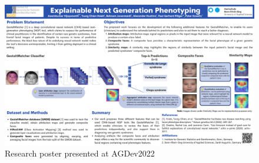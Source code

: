 \documentclass[../report.tex]{subfiles}
\begin{document}
\begin{itemize}
      \begin{figure}
    	\includegraphics[scale=0.4]{images/poster_1.pdf}
    	\caption{Research poster presented at AGDev2022}
      \end{figure}
	\end{itemize}
\end{document}
